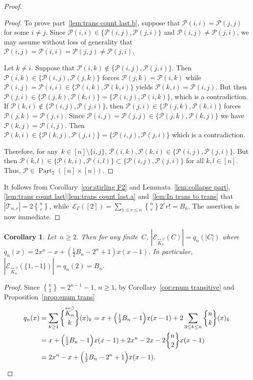 \documentclass[12pt, reqno]{amsart}
\newcommand{\stirling}[2]{\genfrac{\{}{\}}{0pt}0{#1}{#2}}
\newcommand{\tstirling}[2]{\genfrac{\{}{\}}{0pt}1{#1}{#2}}
\newtheorem{corollary}[theorem]{Corollary}
\theoremstyle{definition}
\numberwithin{equation}{section}
\DeclareMathOperator{\Part}{Part}
\begin{document}
\begin{proof}
\begin{proof}
To prove part~\ref{lem:trans count last.b}, suppose that
$\mathcal P(i,i)=\mathcal P(j,j)$ for some $i\not=j$.
Since $\mathcal P(i,i)\in\{\mathcal P(i,j),\mathcal P(j,i)\}$
and $\mathcal P(i,j)\not=\mathcal P(j,i)$, we may assume without loss of generality that $\mathcal P(i,j)=\mathcal P(i,i)=\mathcal P(j,j)\not=\mathcal P(j,i)$.

Let $k\not=i$. 
Suppose that $\mathcal P(i,k)\notin\{\mathcal P(i,j),\mathcal P(j,i)\}$. Then $\mathcal P(i,k)\in\{\mathcal P(i,j),\mathcal P(j,k)\}$
forces $\mathcal P(j,k)=\mathcal P(i,k)$ while $\mathcal P(i,j)=\mathcal P(i,i)\in\{\mathcal P(i,k),\mathcal P(k,i)\}$ yields $\mathcal P(k,i)=\mathcal P(i,j)$.
But then $\mathcal P(j,i)\in\{\mathcal P(j,k),\mathcal P(k,i)\}=\{\mathcal P(i,j),
\mathcal P(i,k)\}$, which is a contradiction.
If $\mathcal P(k,i)\notin\{\mathcal P(i,j),\mathcal P(j,i)\}$, then
$\mathcal P(j,i)\in\{\mathcal P(j,k),\mathcal P(k,i)\}$ forces $\mathcal P(j,k)=\mathcal P(j,i)$.
Since $\mathcal P(i,j)=\mathcal P(j,j)\in\{\mathcal P(j,k),\mathcal P(k,j)\}$ we have $\mathcal P(k,j)=\mathcal P(i,j)$. Then $\mathcal P(k,i)\in\{\mathcal P(k,j),\mathcal P(j,i)\}
=\{\mathcal P(i,j),\mathcal P(j,i)\}$ which is a contradiction. 

Therefore, for any~$k\in[n]\setminus\{i,j\}$, $\mathcal P(i,k),\mathcal P(k,i)\in \{\mathcal P(i,j),\mathcal P(j,i)\}$.
But then $\mathcal P(k,l)\in\{\mathcal P(k,i),\mathcal P(i,l)\}\subset \{\mathcal P(i,j),\mathcal P(j,i)\}$ for all $k,l\in [n]$. Thus, $\mathcal P\in\Part_2([n]\times[n])$. 
\end{proof}
It follows from Corollary~\ref{cor:stirling F2} and Lemmata~\ref{lem:collapse part}, \ref{lem:trans count last}\ref{lem:trans count last.a} and~\ref{lem:In trans to trans} that~$|\mathscr T_{n,r}|=2\tstirling{n}{r}$,
while~$\mathcal E_{\Gamma}([2])=\sum_{1\le r\le n}\tstirling{n}{r}2^r r!=B_n$. The assertion is now immediate.
\end{proof}
\begin{corollary}\label{cor:poly q_n}
Let~$n\ge 2$. Then for any finite~$C$, $|\mathcal E_{\overset{\leftrightarrow\circlearrowleft}{K_n}}(C)|=q_n(|C|)$ where~$q_n(x)=
2x^n-x+(\frac12B_n-2^n+1)x(x-1)$. In particular, $|\mathcal E_{\overset{\leftrightarrow\circlearrowleft}{K_n}}(\{1,-1\})|=q_n(2)=B_n$.
\end{corollary}
\begin{proof}
Since $\tstirling{n}{2}=2^{n-1}-1$, $n\ge 1$,
by Corollary~\ref{cor:enum transitive} 
and Proposition~\ref{prop:enum trans}
\begin{align*}
q_n(x)&=\sum_{k\ge 1} \stirling{\overset{\leftrightarrow\circlearrowleft}{K_n}}{k}
(x)_k=x+\Big(\tfrac12B_n-1\Big)x(x-1)+2\sum_{3\le k\le n}\stirling{n}{k}(x)_k\\
&=x+\Big(\tfrac12B_n-1\Big)x(x-1)+2x^n-2x-2\stirling{n}{2}x(x-1)\\
&=2x^n-x+\Big(\tfrac12B_n-2^n+1\Big)x(x-1).\qedhere
\end{align*} 
\end{proof}
\end{document}
